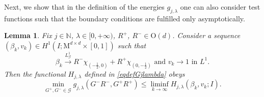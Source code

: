 \documentclass[a4paper,reqno]{amsart}
\newcommand\N{\mathbb{N}}
\newcommand\toG{\xrightarrow{{L}^1_\G}}
\newtheorem{lemma}[definition]{Lemma}
\theoremstyle{remark}
\newcommand{\G}{\mathcal{G}}
\newcommand{\On}{\mathrm{O}(d)}
\newcommand{\Mno}{\mathrm{M}^{d\times d}}
\numberwithin{equation}{section}
\begin{document}
Next, we show that in the definition of the energies $g_{j,\lambda}$ one can also consider test functions such that the boundary conditions are fulfilled only asymptotically.

\begin{lemma}\label{lemmalbGjlambdaboundaryvalues}
Fix $j\in\N$, $\lambda\in[0,+\infty)$, $R^+$, $ R^- \in \On$. Consider a sequence $(\beta_k,v_k)\in H^1(I;\Mno\times[0,1])$
such that
\begin{equation}
\beta_k \toG R^-\chi_{(-\frac12,0)}+
R^+\chi_{(0,-\frac12)} 
\text{ and } v_k\to 1 
\text{ in } L^1.
\end{equation}
Then the functional $H_{j,\lambda}$ defined in \eqref{eqdefGjlambda}  obeys
\begin{equation}
\min_{G^+,G^-\in\G}
g_{j,\lambda}(G^-R^-,G^+R^+)
\le \liminf_{k\to\infty}  H_{j,\lambda}(\beta_k,v_k;I).
\end{equation}
\end{lemma}
\end{document}
